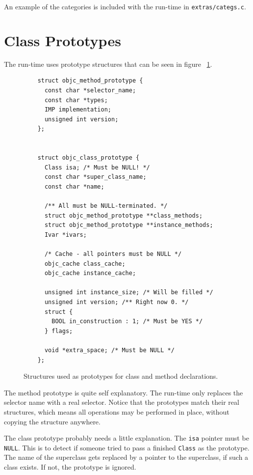 An example of the categories is included with the run-time in \verb=extras/=\newline{}\verb=categs.c=.

\section{Class Prototypes}

The run-time uses prototype structures that can be seen in figure ~\ref{fig:objc_prototypes}.

\begin{figure}[H]
  \begin{verbatim}
    struct objc_method_prototype {
      const char *selector_name;
      const char *types;
      IMP implementation;
      unsigned int version;
    };
    
    
    struct objc_class_prototype {
      Class isa; /* Must be NULL! */
      const char *super_class_name;
      const char *name;
	
      /** All must be NULL-terminated. */
      struct objc_method_prototype **class_methods;
      struct objc_method_prototype **instance_methods;
      Ivar *ivars;
	
      /* Cache - all pointers must be NULL */
      objc_cache class_cache;
      objc_cache instance_cache;
	
      unsigned int instance_size; /* Will be filled */
      unsigned int version; /** Right now 0. */
      struct {
        BOOL in_construction : 1; /* Must be YES */
      } flags;
      
      void *extra_space; /* Must be NULL */
    };
  \end{verbatim}
  \centering{}
  \caption{Structures used as prototypes for class and method declarations.}
  \label{fig:objc_prototypes}
\end{figure}

The method prototype is quite self explanatory. The run-time only replaces the selector name with a real selector. Notice that the prototypes match their real structures, which means all operations may be performed in place, without copying the structure anywhere.

The class prototype probably needs a little explanation. The \verb=isa= pointer must be \verb=NULL=. This is to detect if someone tried to pass a finished \verb=Class= as the prototype. The name of the superclass gets replaced by a pointer to the superclass, if such a class exists. If not, the prototype is ignored.


